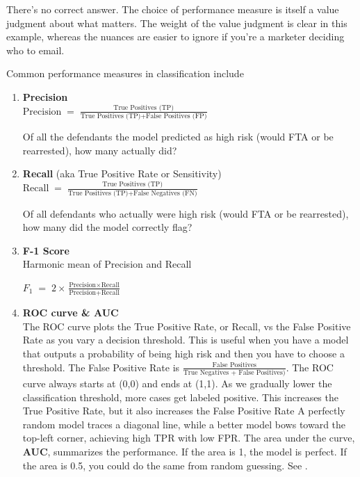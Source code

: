There's no correct answer. The choice of performance measure is itself a value judgment about what matters. The weight of the value judgment is clear in this example, whereas the nuances are easier to ignore if you're a marketer deciding who to email.

Common performance measures in classification include

\begin{enumerate}
\item \textbf{Precision}\\
$\text{Precision} \;=\; \frac{\text{True Positives (TP)}}{\text{True Positives (TP)} + \text{False Positives (FP)}}$

Of all the defendants the model predicted as high risk (would FTA or be rearrested), how many actually did?

\item \textbf{Recall} (aka True Positive Rate or Sensitivity)\\
$\text{Recall} \;=\; \frac{\text{True Positives (TP)}}{\text{True Positives (TP)} + \text{False Negatives (FN)}}$

Of all defendants who actually were high risk (would FTA or be rearrested), how many did the model correctly flag?

\item \textbf{F-1 Score}\\
Harmonic mean of Precision and Recall

$F_1 \;=\; 2 \times \frac{\text{Precision} \times \text{Recall}}{\text{Precision} + \text{Recall}}$

\item \textbf{ROC curve \& AUC}\\
The ROC curve plots the True Positive Rate, or Recall, vs the False Positive Rate as you vary a decision threshold. This is useful when you have a model that outputs a probability of being high risk and then you have to choose a threshold. The False Positive Rate is $\frac{\text{False Positives}}{\text{True Negatives + False Positives)}}$. The ROC curve always starts at (0,0) and ends at (1,1). As we gradually lower the classification threshold, more cases get labeled positive. This increases the True Positive Rate, but it also increases the False Positive Rate A perfectly random model traces a diagonal line, while a better model bows toward the top-left corner, achieving high TPR with low FPR. The area under the curve, \textbf{AUC}, summarizes the performance. If the area is 1, the model is perfect. If the area is 0.5, you could do the same from random guessing. See \cite{fawcett2006introduction}.
\end{enumerate}

